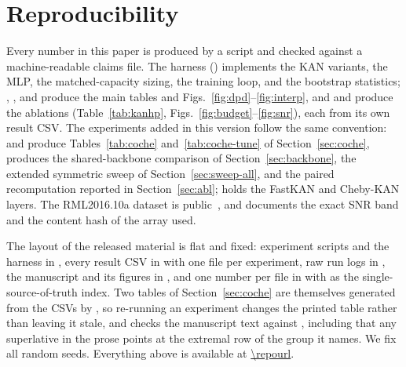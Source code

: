 \documentclass[final,5p,times]{elsarticle}
\newcommand{\repolink}{\expandafter\url\expandafter{\repourl}}
\begin{document}
\section{Reproducibility}\label{sec:repro}
Every number in this paper is produced by a script and checked against a machine-readable
claims file. The harness () implements the KAN variants, the MLP, the
matched-capacity sizing, the training loop, and the bootstrap statistics; ,
, and  produce the main tables and
Figs.~\ref{fig:dpd}--\ref{fig:interp}, and  and 
produce the ablations (Table~\ref{tab:kanhp}, Figs.~\ref{fig:budget}--\ref{fig:snr}), each
from its own result CSV. The experiments added in this version follow the same convention:
 and  produce
Tables~\ref{tab:coche} and~\ref{tab:coche-tune} of Section~\ref{sec:coche},
 produces the shared-backbone comparison of
Section~\ref{sec:backbone},  the extended symmetric sweep of
Section~\ref{sec:sweep-all}, and  the paired recomputation
reported in Section~\ref{sec:abl};  holds the FastKAN and Cheby-KAN layers.
The RML2016.10a dataset is public~\cite{oshea2016gnuradio}, and
 documents the exact SNR band and the content hash of the array used.

The layout of the released material is flat and fixed: experiment scripts and the harness in
, every result CSV in  with one file per experiment, raw run
logs in , the manuscript and its figures in , and one
number per file in  with  as the
single-source-of-truth index. Two tables of Section~\ref{sec:coche} are themselves generated
from the CSVs by , so re-running an experiment changes the
printed table rather than leaving it stale, and  checks the
manuscript text against , including that any superlative in the prose points
at the extremal row of the group it names. We fix all random seeds. Everything above is
available at \repolink.

\end{document}
